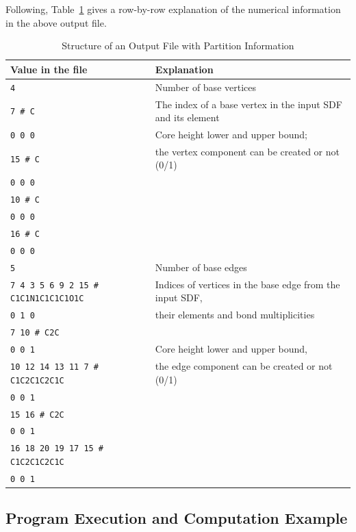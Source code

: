 \documentclass[11pt,titlepage,dvipdfmx,twoside]{book}
\begin{document}
Following, Table~\ref{tab:PartitionFormat}
gives a row-by-row explanation of the numerical information in the
above output file.


\bigskip
\begin{table}[H]
\begin{center} \caption{Structure of an Output File with Partition Information}
\label{tab:PartitionFormat}
  \begin{tabular}{l|l}
  Value in the file & Explanation \\ \hline \hline
{\tt  4} & Number of base vertices \\ \hline
{\tt  7 \# C} & The index of a base vertex in the input SDF and its element\\
{\tt  0 0 0} & Core height lower and upper bound; \\
{\tt  15 \# C} & \hspace{10mm} the vertex component can be created or not (0/1) \\
{\tt  0 0 0} & \\
{\tt  10 \# C} & \\
{\tt  0 0 0} & \\ 
{\tt  16 \# C} &\\ 
{\tt  0 0 0} & \\ \hline
{\tt  5} & Number of base edges　\\ \hline
{\tt  7 4 3 5 6 9 2 15 \# C1C1N1C1C1C1O1C} & Indices of vertices in the base edge from the input SDF,\\
{\tt  0 1 0} & \hspace{10mm} their elements and bond multiplicities　\\
{\tt  7 10 \# C2C} &\\ 
{\tt  0 0 1} &Core height lower and upper bound,\\
{\tt  10 12 14 13 11 7 \# C1C2C1C2C1C} &\hspace{10mm} the edge component can be created or not (0/1) \\
{\tt  0 0 1} & \\
{\tt  15 16 \# C2C} & \\
{\tt  0 0 1} & \\
{\tt  16 18 20 19 17 15 \# C1C2C1C2C1C} & \\
{\tt  0 0 1} & \\ \hline
  \end{tabular}
\end{center}
\end{table}



\subsection{Program Execution and Computation Example}
\label{sec:Example_p}
\end{document}
